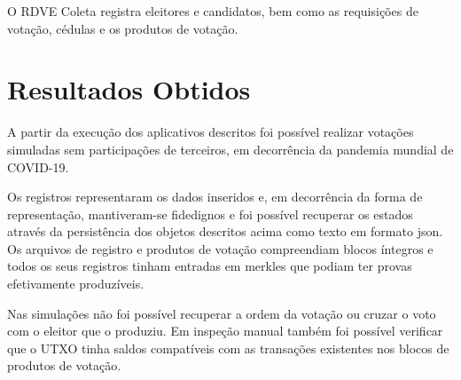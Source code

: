 O RDVE Coleta registra eleitores e candidatos, bem como as requisições de votação, cédulas e os produtos de votação.

\section{Resultados Obtidos}

A partir da execução dos aplicativos descritos foi possível realizar votações simuladas sem participações de terceiros, em decorrência da pandemia mundial de COVID-19.

Os registros representaram os dados inseridos e, em decorrência da forma de representação, mantiveram-se fidedignos e foi possível recuperar os estados através da persistência dos objetos descritos acima como texto em formato \gls{json}. Os arquivos de registro e produtos de votação compreendiam blocos íntegros e todos os seus registros tinham entradas em \glspl{merkle} que podiam ter provas efetivamente produzíveis. 

Nas simulações não foi possível recuperar a ordem da votação ou cruzar o voto com o eleitor que o produziu. Em inspeção manual também foi possível verificar que o UTXO tinha saldos compatíveis com as transações existentes nos blocos de produtos de votação. 